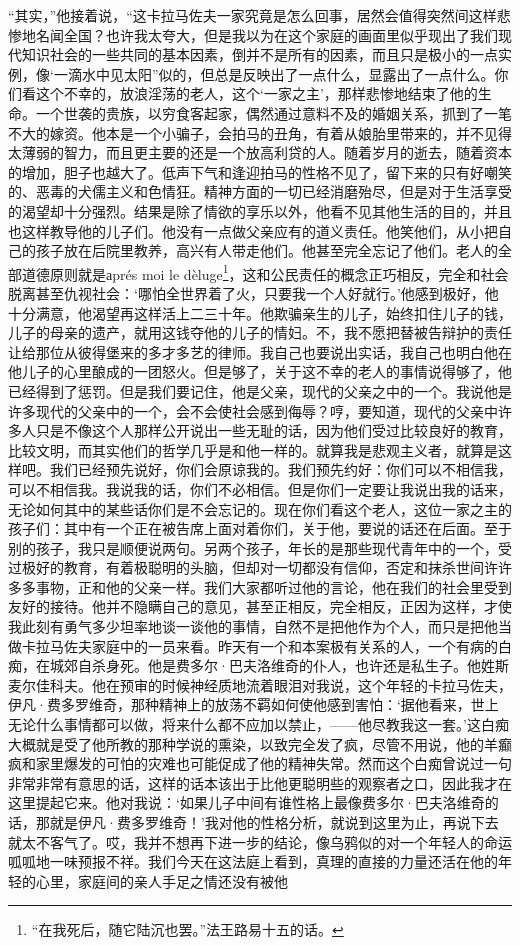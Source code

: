 \par “其实，”他接着说，“这卡拉马佐夫一家究竟是怎么回事，居然会值得突然间这样悲惨地名闻全国？也许我太夸大，但是我以为在这个家庭的画面里似乎现出了我们现代知识社会的一些共同的基本因素，倒并不是所有的因素，而且只是极小的一点实例，像‘一滴水中见太阳”似的，但总是反映出了一点什么，显露出了一点什么。你们看这个不幸的，放浪淫荡的老人，这个‘一家之主’，那样悲惨地结束了他的生命。一个世袭的贵族，以穷食客起家，偶然通过意料不及的婚姻关系，抓到了一笔不大的嫁资。他本是一个小骗子，会拍马的丑角，有着从娘胎里带来的，并不见得太薄弱的智力，而且更主要的还是一个放高利贷的人。随着岁月的逝去，随着资本的增加，胆子也越大了。低声下气和逢迎拍马的性格不见了，留下来的只有好嘲笑的、恶毒的犬儒主义和色情狂。精神方面的一切已经消磨殆尽，但是对于生活享受的渴望却十分强烈。结果是除了情欲的享乐以外，他看不见其他生活的目的，并且也这样教导他的儿子们。他没有一点做父亲应有的道义责任。他笑他们，从小把自己的孩子放在后院里教养，高兴有人带走他们。他甚至完全忘记了他们。老人的全部道德原则就是аprés moi le dèluge\footnote{“在我死后，随它陆沉也罢。”法王路易十五的话。}，这和公民责任的概念正巧相反，完全和社会脱离甚至仇视社会：‘哪怕全世界着了火，只要我一个人好就行。’他感到极好，他十分满意，他渴望再这样活上二三十年。他欺骗亲生的儿子，始终扣住儿子的钱，儿子的母亲的遗产，就用这钱夺他的儿子的情妇。不，我不愿把替被告辩护的责任让给那位从彼得堡来的多才多艺的律师。我自己也要说出实话，我自己也明白他在他儿子的心里酿成的一团怒火。但是够了，关于这不幸的老人的事情说得够了，他已经得到了惩罚。但是我们要记住，他是父亲，现代的父亲之中的一个。我说他是许多现代的父亲中的一个，会不会使社会感到侮辱？哼，要知道，现代的父亲中许多人只是不像这个人那样公开说出一些无耻的话，因为他们受过比较良好的教育，比较文明，而其实他们的哲学几乎是和他一样的。就算我是悲观主义者，就算是这样吧。我们已经预先说好，你们会原谅我的。我们预先约好：你们可以不相信我，可以不相信我。我说我的话，你们不必相信。但是你们一定要让我说出我的话来，无论如何其中的某些话你们是不会忘记的。现在你们看这个老人，这位一家之主的孩子们：其中有一个正在被告席上面对着你们，关于他，要说的话还在后面。至于别的孩子，我只是顺便说两句。另两个孩子，年长的是那些现代青年中的一个，受过极好的教育，有着极聪明的头脑，但却对一切都没有信仰，否定和抹杀世间许许多多事物，正和他的父亲一样。我们大家都听过他的言论，他在我们的社会里受到友好的接待。他并不隐瞒自己的意见，甚至正相反，完全相反，正因为这样，才使我此刻有勇气多少坦率地谈一谈他的事情，自然不是把他作为个人，而只是把他当做卡拉马佐夫家庭中的一员来看。昨天有一个和本案极有关系的人，一个有病的白痴，在城郊自杀身死。他是费多尔·巴夫洛维奇的仆人，也许还是私生子。他姓斯麦尔佳科夫。他在预审的时候神经质地流着眼泪对我说，这个年轻的卡拉马佐夫，伊凡·费多罗维奇，那种精神上的放荡不羁如何使他感到害怕：‘据他看来，世上无论什么事情都可以做，将来什么都不应加以禁止，——他尽教我这一套。’这白痴大概就是受了他所教的那种学说的熏染，以致完全发了疯，尽管不用说，他的羊癫疯和家里爆发的可怕的灾难也可能促成了他的精神失常。然而这个白痴曾说过一句非常非常有意思的话，这样的话本该出于比他更聪明些的观察者之口，因此我才在这里提起它来。他对我说：‘如果儿子中间有谁性格上最像费多尔·巴夫洛维奇的话，那就是伊凡·费多罗维奇！’我对他的性格分析，就说到这里为止，再说下去就太不客气了。哎，我并不想再下进一步的结论，像乌鸦似的对一个年轻人的命运呱呱地一味预报不祥。我们今天在这法庭上看到，真理的直接的力量还活在他的年轻的心里，家庭间的亲人手足之情还没有被他